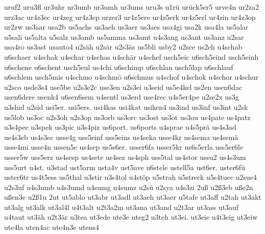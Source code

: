 {    uruf2
    uru3fl
    ur3uhr
    ur3umb
    ur3umh
    ur3ums
    uru3s
    u1rü
    urück5er5
    urve4n
    ur2za2
    urz3ac
    ur4z3ec
    ur4zeg
    ur4z3ep
    urzer3
    ur4z5ere
    ur4z5erk
    ur4z5erl
    ur4zin
    ur4z3op
    ur2zw
    us3aar
    usa2b
    us5achs
    us3aeh
    us3aer
    us3aes
    usa4gi
    usa2k
    usa4la
    us5alar
    u5sali
    us5alta
    u5salz
    us3amb
    us5amma
    us3amt
    u4s3ang
    us3ant
    us3anz
    u2sar
    usa4ro
    us3ast
    usauto4
    u2säh
    u2sär
    u2s3äs
    us5bli
    usby2
    u2sce
    us2ch
    u4schab
    u6schaer
    u4schak
    u4schar
    u4schas
    u4schär
    u4schef
    usch5eic
    u6sch5eind
    usch5einh
    u6schene
    u6schent
    usch5eul
    us4chi
    u6schimp
    u6schlan
    usch5lap
    u6schlauf
    u6schlem
    usch5mis
    u4schmo
    u4schmö
    u6schmus
    u4schof
    u4schok
    u4schor
    u4schur
    u2sco
    usde3s4
    use5be
    u2s3e2c
    use3en
    u2s3ei
    u3seid
    us5e4kel
    us2en
    usen6dac
    usen6dere
    usenk4
    u6sen6sem
    u4sentl
    us3erd
    use4rec
    u4s5er4pe
    u2se2x
    us3g
    u3shid
    u2sid
    usi5er.
    usi5ers.
    usi4kas
    usi4kat
    usiken4
    us3ind
    us3inf
    us3int
    u2sk
    us5lob
    us3oc
    u2s3oh
    u2s3op
    us3orb
    us3orc
    us3ost
    us3ot
    us3ou
    us4pate
    us4patz
    u3s4pec
    u3spek
    us3pic
    u3s4piz
    us6port.
    us6ports
    u4sprae
    u4s5prä
    us4s3ad
    us4s3eb
    us4s3ec
    usse4g
    uss5einf
    uss5eins
    us4seka
    usse4kr
    us4sema
    us4semä
    usse4mi
    usse4n
    ussen5e
    us4sep
    us5s6er.
    usser6fa
    usser5kr
    us6s5erla
    uss5er6le
    usser5w
    uss5erz
    us4sesp
    us4sete
    us4sez
    us4sph
    uss5tal
    us4stor
    ussu2
    us4s3um
    uss5urt
    u4st.
    u3stad
    ust5arm
    usta4v
    ust5ave
    u6stele
    ustell5a
    ust6er.
    uster6fü
    uster6tr
    us4t5ess
    us5thal
    u3stir
    u3s4tol
    u4stöp
    u5strah
    u5streck
    u5s4tuec
    u2sue4
    u2s3uf
    u4s3umb
    u4s3umd
    u4sumg
    u4sumz
    u2sü
    u2sya
    u4s3zi
    2uß
    u2ß3eb
    uße2n
    ußen3e
    u2ß1u
    2ut
    ut5ablo
    ut3abr
    ut3adl
    ut3aeh
    ut3aer
    u5tafe
    ut3aff
    u2tah
    ut3akt
    ut3alg
    ut3alk
    ut3al4l
    u4t3alt
    u2t3a2m
    ut3ana
    ut3and
    u2t3ar
    ut3ass
    ut3auf
    u4taut
    ut3äh
    u2t3är
    u3tea
    ut3ede
    ute3e
    uteg2
    u3teh
    ut3ei.
    ut3eie
    u4t3eig
    ut3eiw
    ute4la
    uten4ac
    ute4n3e
    utens4
}
